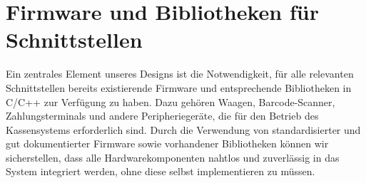 \documentclass[a4paper,11pt]{article}
\begin{document}
\section{Firmware und Bibliotheken für Schnittstellen}
Ein zentrales Element unseres Designs ist die Notwendigkeit, für alle relevanten Schnittstellen bereits existierende Firmware und entsprechende Bibliotheken in C/C++ zur Verfügung zu haben. Dazu gehören Waagen, Barcode-Scanner, Zahlungsterminals und andere Peripheriegeräte, die für den Betrieb des Kassensystems erforderlich sind. Durch die Verwendung von standardisierter und gut dokumentierter Firmware sowie vorhandener Bibliotheken können wir sicherstellen, dass alle Hardwarekomponenten nahtlos und zuverlässig in das System integriert werden, ohne diese selbst implementieren zu müssen.
\end{document}
